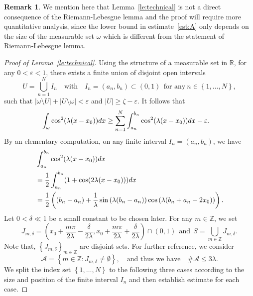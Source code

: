 \documentclass[a4paper,reqno]{amsart}
\theoremstyle{definition}
\newtheorem{remark}[theorem]{Remark}
\numberwithin{equation}{section}
\newcommand{\R}{\mathbb{R}}
\def \R {{\mathbb{R} }}
\def \d {{\rm{d}}}
\begin{document}
\begin{remark}
    We mention here that Lemma~\ref{le:technical} is not a direct consequence of the Riemann-Lebesgue lemma and the proof will require more quantitative analysis, since the lower bound in estimate~\eqref{est:A} only depends on the size of the measurable set $\omega$ which is different from the statement of Riemann-Lebesgue lemma.
    \end{remark}

\begin{proof}[Proof of Lemma~\ref{le:technical}]
Using the structure of a measurable set in $\R$, for any $0<\varepsilon<1$, there exists a finite union of disjoint open intervals 
\begin{equation*}
    U=\bigcup\limits_{n=1}^{N}I_{n}\quad \mbox{with}\quad 
    I_{n}=(a_{n},b_{n})\subset (0,1) \  \ \mbox{for any}\ n\in \left\{1,\dots,N\right\},
    \end{equation*}
    such that $|\omega \setminus U|+|U\setminus \omega |<\varepsilon$ and $|U|\ge \zeta-\varepsilon$.
    It follows that 
    \begin{equation}\label{est:cos2}
    \begin{aligned}
       \int_{\omega}\cos^{2}(\lambda(x-x_{0}))\d x
       &\ge 
       \sum_{n=1}^{N}\int_{a_{n}}^{b_{n}}\cos^{2}(\lambda(x-x_{0}))\d x-\varepsilon.
       \end{aligned}
        \end{equation}
By an elementary computation, on any finite interval $I_{n}=(a_{n},b_{n})$, we have 
\begin{equation}\label{est:ajbj}
\begin{aligned}
    &\int_{a_{n}}^{b_{n}}\cos^{2}(\lambda(x-x_{0}))\d x\\
    &=\frac{1}{2}\int_{a_{n}}^{b_{n}}(1+\cos (2\lambda(x-x_{0})))\d x\\
    &=\frac{1}{2}\left((b_{n}-a_{n})+\frac{1}{\lambda}\sin \left(\lambda(b_{n}-a_{n})\right)\cos \left(\lambda(b_{n}+a_{n}-2x_{0})\right)\right).
    \end{aligned}
    \end{equation}
Let $0<\delta\ll 1$ be a small constant to be chosen later. For any $m\in \mathbb{Z}$, we set 
\begin{equation*}
    J_{m,\delta}=\left(x_{0}+\frac{m \pi }{2\lambda}-\frac{\delta}{2\lambda},x_{0}+\frac{m \pi }{2\lambda}+\frac{\delta}{2\lambda}\right)\cap (0,1)\ \ \mbox{and}\  \ S=\bigcup\limits_{m\in \mathbb{Z}}J_{m,\delta}.
    \end{equation*}
Note that, $\left\{J_{m,\delta}\right\}_{m\in \mathbb{Z}}$ are disjoint sets.
For further reference, we consider
\begin{equation*}
    \mathcal{A}=\left\{m\in \mathbb{Z}:J_{m,\delta}\ne \emptyset\right\},\quad \mbox{and thus we have}\quad  \# \mathcal{A}\le 3\lambda.
\end{equation*}
We split the index set $\left\{1,\dots,N\right\}$ to the following three cases according to the size and position of the finite interval $I_{n}$ and then establish estimate for each case.


\end{proof}
\end{document}

